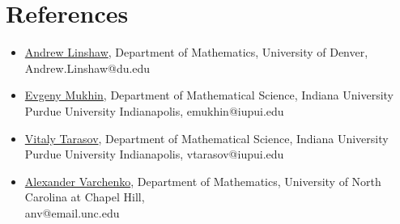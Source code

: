 \documentclass[11pt,letterpaper,roman,colorlinks,urlcolor=teal,linkcolor=teal]{moderncv} %
\begin{document}
\section{References}

\begin{itemize}[leftmargin=1cm]
\item {\href{https://cs.du.edu/~alinshaw/}{Andrew Linshaw}, Department of Mathematics, University of Denver, Andrew.Linshaw@du.edu}
  \item {\href{https://science.iupui.edu/people-directory/people/mukhin-evgeny.html}{Evgeny Mukhin}, Department of Mathematical Science, Indiana University Purdue University Indianapolis, emukhin@iupui.edu}
  \item {\href{https://science.iupui.edu/people-directory/people/tarasov-vitaly.html}{Vitaly Tarasov}, Department of Mathematical Science, Indiana University Purdue University Indianapolis, vtarasov@iupui.edu}
  \item {\href{https://varchenko.web.unc.edu/}{Alexander Varchenko}, Department of Mathematics, University of North Carolina at Chapel Hill,\\anv@email.unc.edu}
\end{itemize}
\end{document}

